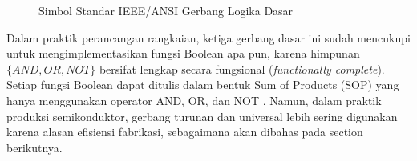 \begin{figure}[htbp]
\centering
{}
\caption{Simbol Standar IEEE/ANSI Gerbang Logika Dasar}
\label{fig:gerbang-dasar-11}
\end{figure}

Dalam praktik perancangan rangkaian, ketiga gerbang dasar ini sudah mencukupi untuk mengimplementasikan fungsi Boolean apa pun, karena himpunan $\{AND, OR, NOT\}$ bersifat lengkap secara fungsional (\textit{functionally complete}). Setiap fungsi Boolean dapat ditulis dalam bentuk Sum of Products (SOP) yang hanya menggunakan operator AND, OR, dan NOT \cite{rosen2019}. Namun, dalam praktik produksi semikonduktor, gerbang turunan dan universal lebih sering digunakan karena alasan efisiensi fabrikasi, sebagaimana akan dibahas pada section berikutnya.
